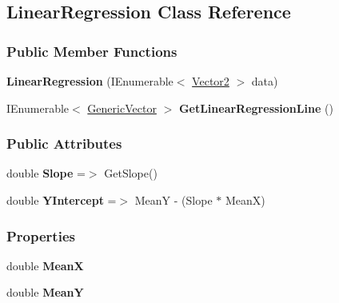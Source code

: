 \hypertarget{classDataTools_1_1regression_1_1LinearRegression}{}\subsection{Linear\+Regression Class Reference}
\label{classDataTools_1_1regression_1_1LinearRegression}
\subsubsection*{Public Member Functions}
\begin{DoxyCompactItemize}
\item 
\mbox{\label{classDataTools_1_1regression_1_1LinearRegression_a078ff0b1ed123224bbd3812dea2ab4cb}} 
{\bfseries Linear\+Regression} (I\+Enumerable$<$ \hyperlink{classDataTools_1_1Vector2}{Vector2} $>$ data)
\item 
\mbox{\label{classDataTools_1_1regression_1_1LinearRegression_ac15c1aae813e09c932acdb404220efb7}} 
I\+Enumerable$<$ \hyperlink{classDataTools_1_1GenericVector}{Generic\+Vector} $>$ {\bfseries Get\+Linear\+Regression\+Line} ()
\end{DoxyCompactItemize}
\subsubsection*{Public Attributes}
\begin{DoxyCompactItemize}
\item 
\mbox{\label{classDataTools_1_1regression_1_1LinearRegression_a4cde7a11956732a0838d90f771c3e2e9}} 
double {\bfseries Slope} =$>$ Get\+Slope()
\item 
\mbox{\label{classDataTools_1_1regression_1_1LinearRegression_a69a2f4813f4440c04e501208cd70cd1a}} 
double {\bfseries Y\+Intercept} =$>$ MeanY -\/ (Slope $\ast$ MeanX)
\end{DoxyCompactItemize}
\subsubsection*{Properties}
\begin{DoxyCompactItemize}
\item 
\mbox{\label{classDataTools_1_1regression_1_1LinearRegression_a45a6ec90b2dd3e65489798df98cebd60}} 
double {\bfseries MeanX}
\item 
\mbox{\label{classDataTools_1_1regression_1_1LinearRegression_a5e9a58f6e244fbed6f55d39ca818264a}} 
double {\bfseries MeanY}
\end{DoxyCompactItemize}
